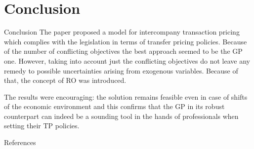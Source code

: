 \documentclass[10pt]{beamer}
\begin{document}
\section{Conclusion}
\begin{frame}{Conclusion}
  The paper proposed a model for intercompany transaction pricing which complies with the legislation in terms of transfer pricing policies. Because of the number of conflicting objectives the best approach seemed to be the GP one. However, taking into account just the conflicting objectives do not leave any remedy to possible uncertainties arising from exogenous variables. Because of that, the concept of RO was introduced.

  The results were encouraging: the solution remains feasible even in case of shifts of the economic environment and this confirms that the GP in its robust counterpart can indeed be a sounding tool in the hands of professionals when setting their TP policies.
\end{frame}

\appendix

\begin{frame}[allowframebreaks]{References}

  
  

\end{frame}
\end{document}
